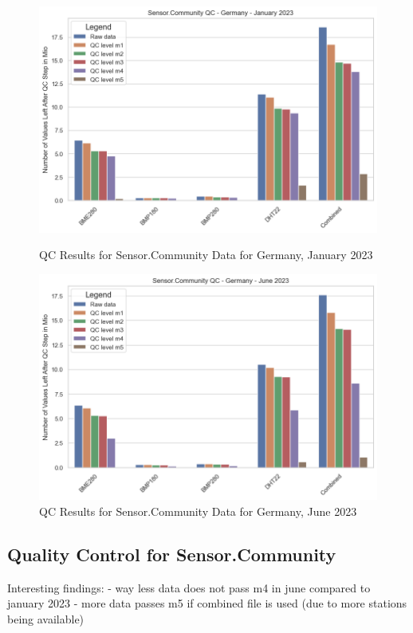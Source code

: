 \begin{figure}[htp]
    \centering
    \includegraphics[width=1\textwidth]{images/sensor_community_qc_january_23.png}
    \caption{QC Results for Sensor.Community Data for Germany, January 2023}
    \label{fig:qc sensor community jan 23}

    \centering
    \includegraphics[width=1\textwidth]{images/sensor_community_qc_june_23.png}
    \caption{QC Results for Sensor.Community Data for Germany, June 2023}
    \label{fig:qc sensor community june 23}
\end{figure}

\subsection{Quality Control for Sensor.Community}

Interesting findings:
- way less data does not pass m4 in june compared to january 2023
- more data passes m5 if combined file is used (due to more stations being available)

